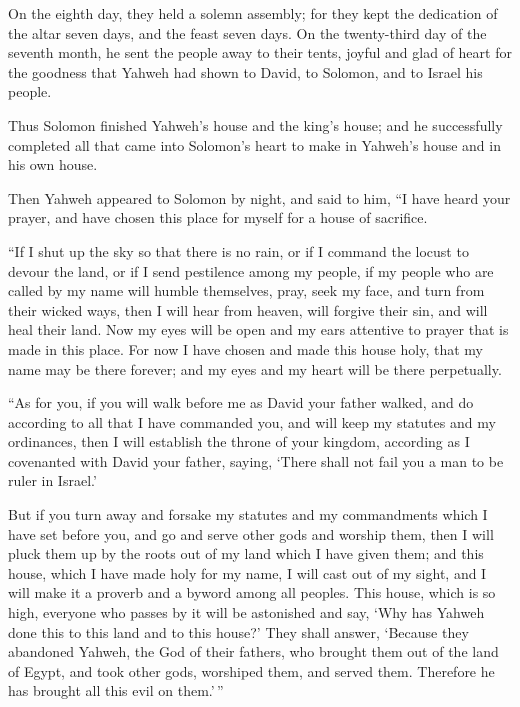  On the eighth day, they held a solemn assembly; for they
kept the dedication of the altar seven days, and the feast seven days.
 On the twenty-third day of the seventh month, he sent
the people away to their tents, joyful and glad of heart for the
goodness that Yahweh had shown to David, to Solomon, and to Israel his
people.

 Thus Solomon finished Yahweh's house and the king's
house; and he successfully completed all that came into Solomon's heart
to make in Yahweh's house and in his own house.

 Then Yahweh appeared to Solomon by night, and said to
him, ``I have heard your prayer, and have chosen this place for myself
for a house of sacrifice.

 ``If I shut up the sky so that there is no rain, or if I
command the locust to devour the land, or if I send pestilence among my
people,  if my people who are called by my name will
humble themselves, pray, seek my face, and turn from their wicked ways,
then I will hear from heaven, will forgive their sin, and will heal
their land.  Now my eyes will be open and my ears
attentive to prayer that is made in this place.  For now
I have chosen and made this house holy, that my name may be there
forever; and my eyes and my heart will be there perpetually.

 ``As for you, if you will walk before me as David your
father walked, and do according to all that I have commanded you, and
will keep my statutes and my ordinances,  then I will
establish the throne of your kingdom, according as I covenanted with
David your father, saying, `There shall not fail you a man to be ruler
in Israel.'

 But if you turn away and forsake my statutes and my
commandments which I have set before you, and go and serve other gods
and worship them,  then I will pluck them up by the roots
out of my land which I have given them; and this house, which I have
made holy for my name, I will cast out of my sight, and I will make it a
proverb and a byword among all peoples.  This house,
which is so high, everyone who passes by it will be astonished and say,
`Why has Yahweh done this to this land and to this house?'
 They shall answer, `Because they abandoned Yahweh, the
God of their fathers, who brought them out of the land of Egypt, and
took other gods, worshiped them, and served them. Therefore he has
brought all this evil on them.'\,''

